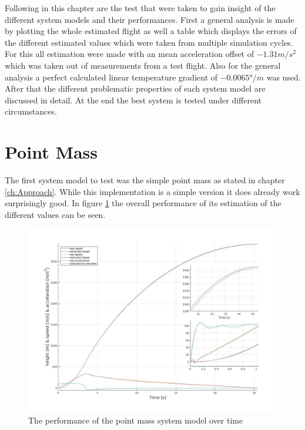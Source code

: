 Following in this chapter are the test that were taken to gain insight of the different system models and their performances.
First a general analysis is made by plotting the whole estimated flight as well a table which displays the errors of the different estimated values which were taken from multiple simulation cycles.
For this all estimation were made with an mean acceleration offset of $ -1.31 m/s^2$  which was taken out of measurements from a test flight.
Also for the general analysis a perfect calculated linear temperature gradient of $-0.0065 °/m$ was used.
After that the different problematic properties of each system model are discussed in detail.
At the end the best system is tested under different circumstances.


\section{Point Mass}
The first system model to test was the simple point mass as stated in chapter \ref{ch:Approach}.
While this implementation is a simple version it does already work surprisingly good.
In figure \ref{fig:PointMassPerformance} the overall performance of its estimation of the different values can be seen.


\begin{figure}[h!]
 \centering
 \includegraphics[width=.8\textwidth]{./Pictures/PointMassPerformance.jpg}
 \caption{The performance of the point mass system model over time}
 \label{fig:PointMassPerformance}
\end{figure}

